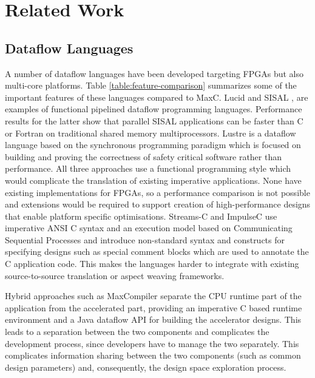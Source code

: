 \section{Related Work}

\subsection{Dataflow Languages}

A number of dataflow languages have been developed targeting FPGAs but
also multi-core platforms. Table \ref{table:feature-comparison}
summarizes some of the important features of these languages compared
to MaxC. Lucid \cite{ashcroft1977lucid} and SISAL
\cite{gurd1987implicit}, \cite{mcgraw1983sisal} are examples of
functional pipelined dataflow programming languages. Performance
results for the latter show that parallel SISAL applications can be
faster \cite{archambault2010fine} than C or Fortran on traditional
shared memory multiprocessors. Lustre \cite{halbwachs1991synchronous}
is a dataflow language based on the synchronous programming paradigm
which is focused on building and proving the correctness of safety
critical software \cite{halbwachs1992programming} rather than
performance.  All three approaches use a functional programming style
which would complicate the translation of existing imperative
applications. None have existing implementations for FPGAs, so a
performance comparison is not possible and extensions would be
required to support creation of high-performance designs that enable
platform specific optimisations.
Streams-C\cite{Gokhale:Stone:Arnold:Kalinowski:2000} and
ImpulseC\cite{ImpulseC} use imperative ANSI C syntax and an execution
model based on Communicating Sequential Processes and introduce
non-standard syntax and constructs for specifying designs such as
special comment blocks which are used to annotate the C application
code. This makes the languages harder to integrate with existing
source-to-source translation or aspect weaving frameworks.

Hybrid approaches such as MaxCompiler \cite{MaxelerTechnologies:2012}
separate the CPU runtime part of the application from the accelerated
part, providing an imperative C based runtime environment and a Java
dataflow API for building the accelerator designs. This leads to a
separation between the two components and complicates the development
process, since developers have to manage the two separately. This
complicates information sharing between the two components (such as
common design parameters) and, consequently, the design space
exploration process.

